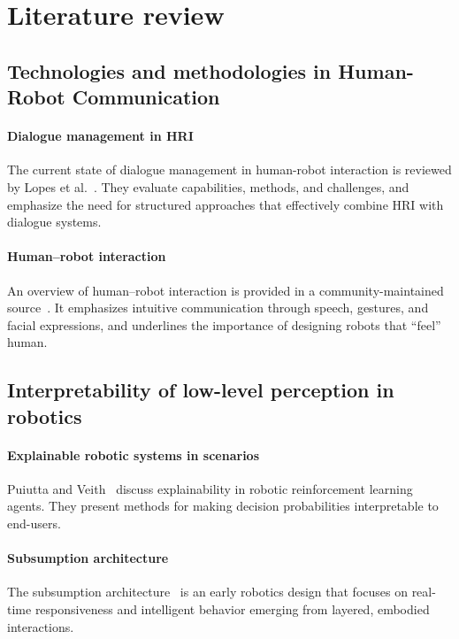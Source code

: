 \section{Literature review}

\subsection{Technologies and methodologies in Human-Robot Communication}

\paragraph{Dialogue management in HRI}
The current state of dialogue management in human-robot interaction is reviewed by Lopes et al.~\cite{dialogue-hri-review}. They evaluate capabilities, methods, and challenges, and emphasize the need for structured approaches that effectively combine HRI with dialogue systems.

\paragraph{Human–robot interaction}
An overview of human–robot interaction is provided in a community-maintained source~\cite{hri-overview}. It emphasizes intuitive communication through speech, gestures, and facial expressions, and underlines the importance of designing robots that “feel” human.

\subsection{Interpretability of low-level perception in robotics}

\paragraph{Explainable robotic systems in scenarios}
Puiutta and Veith~\cite{explainable-rl} discuss explainability in robotic reinforcement learning agents. They present methods for making decision probabilities interpretable to end-users.

\paragraph{Subsumption architecture}
The subsumption architecture~\cite{subsumption} is an early robotics design that focuses on real-time responsiveness and intelligent behavior emerging from layered, embodied interactions.

